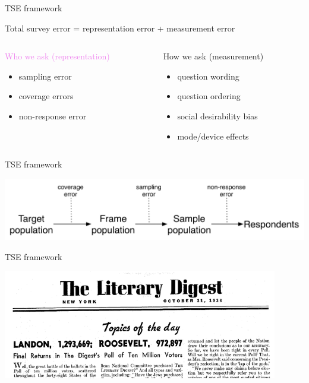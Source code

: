 \documentclass[aspectratio=169]{beamer}
\begin{document}
\begin{frame}{TSE framework}

Total survey error = representation error + measurement error
\vspace{1em}

\begin{columns}[T]

\begin{column}{0.45\textwidth}
\textcolor{violet}{Who we ask (representation)}\\
\begin{itemize}
\item sampling error
\item coverage errors
\item non-response error
\end{itemize}
\end{column}

\begin{column}{0.45\textwidth}
How we ask (measurement)\\
\begin{itemize}
\item question wording
\item question ordering
\item social desirability bias
\item mode/device effects
\end{itemize}
\end{column}

\end{columns}

\end{frame}
\begin{frame}{TSE framework}

\begin{center}
\includegraphics[width=\textwidth]{figures/bitbybit3-2_representation_errors.png}
\end{center}

\end{frame}
\begin{frame}{TSE framework}
\begin{center}
\includegraphics[width=0.9\textwidth]{figures/literary-digest.png}
\end{center}

\end{frame}
\end{document}
